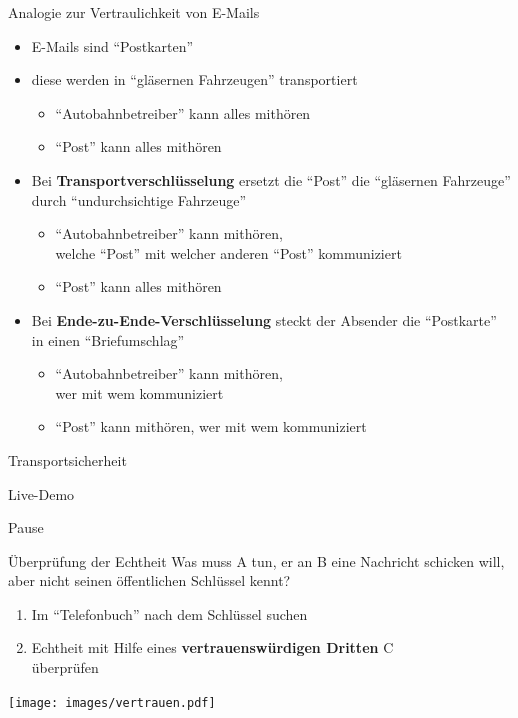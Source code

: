   \begin{frame}{Analogie zur Vertraulichkeit von E-Mails}
    \begin{itemize}
      \item E-Mails sind ``Postkarten''
      \item diese werden in ``gläsernen Fahrzeugen'' transportiert
      \begin{itemize}
        \item ``Autobahnbetreiber'' kann alles mithören
        \item ``Post'' kann alles mithören
      \end{itemize}
      \item Bei \textbf{Transportverschlüsselung} ersetzt die ``Post'' die ``gläsernen Fahrzeuge'' durch ``undurchsichtige Fahrzeuge''
      \begin{itemize}
        \item ``Autobahnbetreiber'' kann mithören,\\welche ``Post'' mit welcher anderen ``Post'' kommuniziert
        \item ``Post'' kann alles mithören
      \end{itemize}
      \item Bei \textbf{Ende-zu-Ende-Verschlüsselung} steckt der Absender die ``Postkarte'' in einen ``Briefumschlag''
      \begin{itemize}
        \item ``Autobahnbetreiber'' kann mithören,\\wer mit wem kommuniziert
        \item ``Post'' kann mithören, wer mit wem kommuniziert
      \end{itemize}
    \end{itemize}
  \end{frame}

  \begin{frame}{Transportsicherheit}
    \begin{centering}
      \Huge Live-Demo
    \end{centering}
  \end{frame}
  
  \begin{frame}
    \begin{centering}
      \Huge Pause
    \end{centering}
  \end{frame}


  \begin{frame}{Überprüfung der Echtheit}
  Was muss A tun, er an B eine Nachricht schicken will, aber nicht seinen öffentlichen Schlüssel kennt?\\
  \begin{enumerate}
    \item Im ``Telefonbuch'' nach dem Schlüssel suchen
    \item Echtheit mit Hilfe eines \textbf{vertrauenswürdigen Dritten} C\\überprüfen
  \end{enumerate}
  \begin{center}
    \texttt{[image: images/vertrauen.pdf]}
  \end{center}
  \end{frame}

